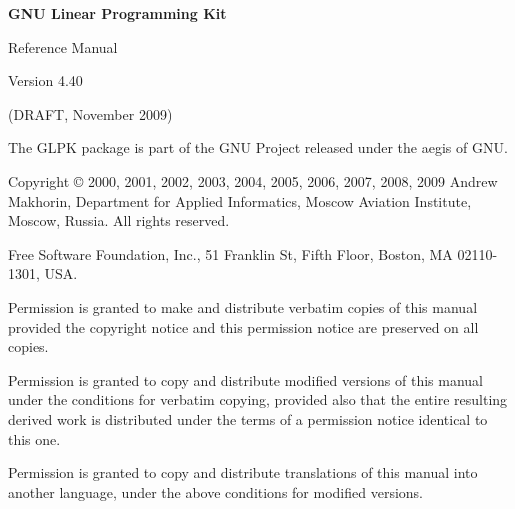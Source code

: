 \documentclass[dvipdfm,11pt]{report}
\begin{document}
\thispagestyle{empty}

\begin{center}

\vspace*{1in}

\begin{huge}
\sf\bfseries GNU Linear Programming Kit
\end{huge}

\vspace{0.5in}

\begin{LARGE}
\sf Reference Manual
\end{LARGE}

\vspace{0.5in}

\begin{LARGE}
\sf Version 4.40
\end{LARGE}

\vspace{0.5in}
\begin{Large}
\sf (DRAFT, November 2009)
\end{Large}
\end{center}

\newpage

\vspace*{1in}

\vfill

\noindent
The GLPK package is part of the GNU Project released under the aegis of
GNU.

\medskip \noindent
Copyright \copyright{} 2000, 2001, 2002, 2003, 2004, 2005, 2006, 2007,
2008, 2009 Andrew Makhorin, Department for Applied Informatics, Moscow
Aviation Institute, Moscow, Russia. All rights reserved.

\medskip \noindent
Free Software Foundation, Inc., 51 Franklin St, Fifth Floor, Boston, MA
02110-1301, USA.

\medskip \noindent
Permission is granted to make and distribute verbatim copies of this
manual provided the copyright notice and this permission notice are
preserved on all copies.

\medskip \noindent
Permission is granted to copy and distribute modified versions of this
manual under the conditions for verbatim copying, provided also that the
entire resulting derived work is distributed under the terms of
a permission notice identical to this one.

\medskip \noindent
Permission is granted to copy and distribute translations of this manual
into another language, under the above conditions for modified versions.

\tableofcontents















\appendix












\end{document}
